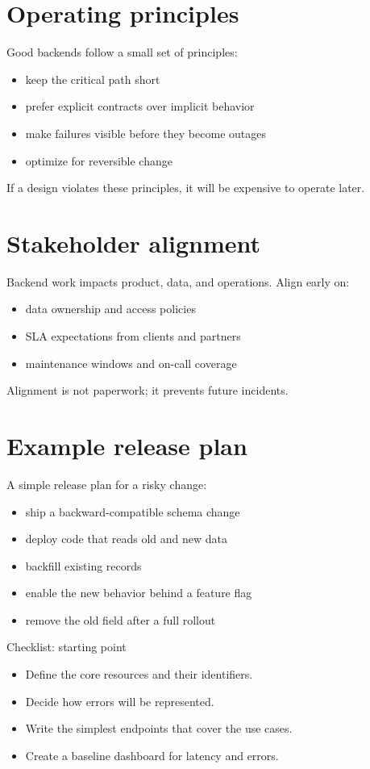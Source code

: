 \section{Operating principles}
Good backends follow a small set of principles:
\begin{itemize}[nosep]
  \item keep the critical path short
  \item prefer explicit contracts over implicit behavior
  \item make failures visible before they become outages
  \item optimize for reversible change
\end{itemize}

If a design violates these principles, it will be expensive to operate later.

\section{Stakeholder alignment}
Backend work impacts product, data, and operations.
Align early on:
\begin{itemize}[nosep]
  \item data ownership and access policies
  \item SLA expectations from clients and partners
  \item maintenance windows and on-call coverage
\end{itemize}

Alignment is not paperwork; it prevents future incidents.

\section{Example release plan}
A simple release plan for a risky change:
\begin{itemize}[nosep]
  \item ship a backward-compatible schema change
  \item deploy code that reads old and new data
  \item backfill existing records
  \item enable the new behavior behind a feature flag
  \item remove the old field after a full rollout
\end{itemize}

\begin{checklistbox}{Checklist: starting point}
\begin{itemize}[nosep]
  \item Define the core resources and their identifiers.
  \item Decide how errors will be represented.
  \item Write the simplest endpoints that cover the use cases.
  \item Create a baseline dashboard for latency and errors.
\end{itemize}
\end{checklistbox}
